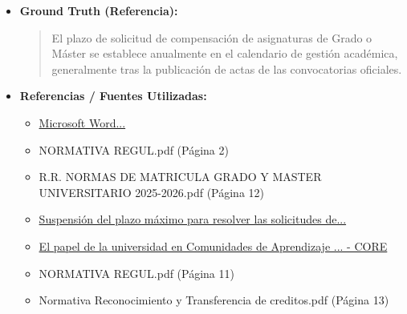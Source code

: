 \documentclass[12pt,a4paper,oneside]{report}
\begin{document}
\begin{itemize}
\begin{itemize}
\begin{quote}
\noindent\textbf{Plazo Límite}\\
Aunque la información proporcionada no especifica claramente el plazo límite para solicitar la evaluación por compensación, es crucial consultar directamente con la Universidad de Sevilla o revisar su sitio web oficial para obtener la información más actualizada y precisa sobre los plazos y procedimientos vigentes. La universidad puede tener fechas límite específicas para diferentes trámites, y es importante respetar estos plazos para evitar cualquier inconveniente en el proceso de solicitud.
                \end{quote}
          \item \textbf{{Ground Truth (Referencia):}} \\
                \begin{quote}
El plazo de solicitud de compensación de asignaturas de Grado o Máster se establece anualmente en el calendario de gestión académica, generalmente tras la publicación de actas de las convocatorias oficiales.
                \end{quote}
          \item \textbf{{Referencias / Fuentes Utilizadas:}} \\
                \begin{itemize}
                  \item \href{https://cat.us.es/sites/default/files/documentos/2023-03/solicitud-compensacion-fondo-accion-social-us.pdf}{Microsoft Word...}
                  \item NORMATIVA REGUL.pdf (Página 2)
                  \item R.R. NORMAS DE MATRICULA GRADO Y MASTER UNIVERSITARIO 2025-2026.pdf (Página 12)
                  \item \href{https://bib.us.es/noticias/suspension-del-plazo-maximo-para-resolver}{Suspensión del plazo máximo para resolver las solicitudes de...}
                  \item \href{https://idus.us.es/bitstreams/9bdcdd17-6e18-4e19-bcc6-54134abf72b4/download}{El papel de la universidad en Comunidades de Aprendizaje ... - CORE}
                  \item NORMATIVA REGUL.pdf (Página 11)
                  \item Normativa Reconocimiento y Transferencia de creditos.pdf (Página 13)
                \end{itemize}
        \end{itemize}


\end{itemize}
\end{document}
